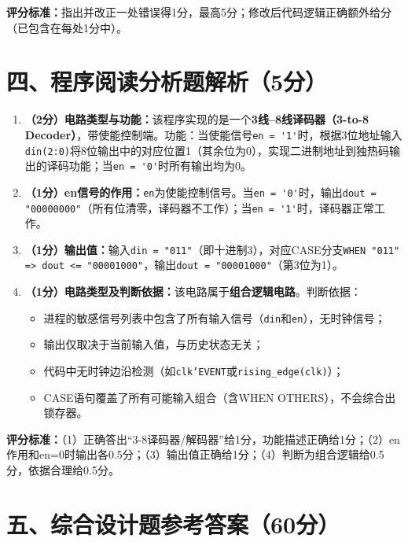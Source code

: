\textbf{评分标准：}指出并改正一处错误得1分，最高5分；修改后代码逻辑正确额外给分（已包含在每处1分中）。

\section{四、程序阅读分析题解析（5分）}

\begin{enumerate}[label=(\arabic*), leftmargin=*]

\item \textbf{（2分）电路类型与功能：}该程序实现的是一个\textbf{3线--8线译码器（3-to-8 Decoder）}，带使能控制端。功能：当使能信号\verb|en = '1'|时，根据3位地址输入\verb|din(2:0)|将8位输出中的对应位置1（其余位为0），实现二进制地址到独热码输出的译码功能；当\verb|en = '0'|时所有输出均为0。

\item \textbf{（1分）en信号的作用：}\verb|en|为使能控制信号。当\verb|en = '0'|时，输出\verb|dout = "00000000"|（所有位清零，译码器不工作）；当\verb|en = '1'|时，译码器正常工作。

\item \textbf{（1分）输出值：}输入\verb|din = "011"|（即十进制3），对应CASE分支\verb|WHEN "011" => dout <= "00001000"|，输出\verb|dout = "00001000"|（第3位为1）。

\item \textbf{（1分）电路类型及判断依据：}该电路属于\textbf{组合逻辑电路}。判断依据：
\begin{itemize}
  \item 进程的敏感信号列表中包含了所有输入信号（\texttt{din}和\texttt{en}），无时钟信号；
  \item 输出仅取决于当前输入值，与历史状态无关；
  \item 代码中无时钟边沿检测（如\texttt{clk'EVENT}或\texttt{rising\_edge(clk)}）；
  \item CASE语句覆盖了所有可能输入组合（含WHEN OTHERS），不会综合出锁存器。
\end{itemize}

\end{enumerate}

\textbf{评分标准：}（1）正确答出“3-8译码器/解码器”给1分，功能描述正确给1分；（2）en作用和en=0时输出各0.5分；（3）输出值正确给1分；（4）判断为组合逻辑给0.5分，依据合理给0.5分。

\section{五、综合设计题参考答案（60分）}

